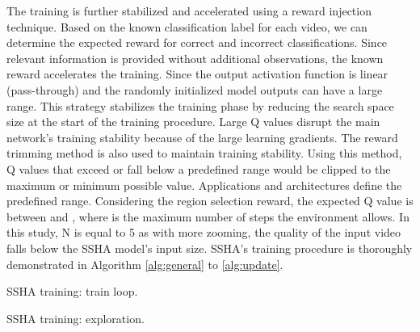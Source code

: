 \documentclass[review]{elsarticle}
\begin{document}
The training is further stabilized and accelerated using a reward injection technique. Based on the known classification label for each video, we can determine the expected reward for correct and incorrect classifications. Since relevant information is provided without additional observations, the known reward accelerates the training. Since the output activation function is linear (pass-through) and the randomly initialized model outputs can have a large range. This strategy stabilizes the training phase by reducing the search space size at the start of the training procedure. Large Q values disrupt the main network's training stability because of the large learning gradients. The reward trimming method is also used to maintain training stability. Using this method, Q values that exceed or fall below a predefined range would be clipped to the maximum or minimum possible value. Applications and architectures define the predefined range. Considering the region selection reward, the expected Q value is between  and , where  is the maximum number of steps the environment allows. In this study, N is equal to 5 as with more zooming, the quality of the input video falls below the SSHA model's input size. SSHA’s training procedure is thoroughly demonstrated in Algorithm \ref{alg:general} to \ref{alg:update}.

\begin{algorithm}
  \caption{SSHA training: train loop.}
  \label{alg:general}
  \begin{algorithmic}[1]
    \FOR{}
        \STATE 
        \STATE 
    \ENDFOR
  \end{algorithmic}
\end{algorithm}

\begin{algorithm}
  \caption{SSHA training:  exploration.}
  \label{alg:action}
  \begin{algorithmic}[1]
    \STATE 
    \STATE 
    \WHILE{}
        \IF{}
            \IF{}
                \STATE 
            \ELSE
                \STATE 
            \ENDIF
            
            \STATE 
        \ELSE
            \STATE  \\ \hskip\algorithmicindent 
        \ENDIF
        
        \STATE 
        \IF{ \\ \hskip\algorithmicindent \AND  \\ \hskip\algorithmicindent \OR  \\ \hskip\algorithmicindent }
            \STATE \hskip\algorithmicindent 
            \STATE \hskip\algorithmicindent 
            \STATE \hskip\algorithmicindent { \\
            \hskip\algorithmicindent \hskip\algorithmicindent }
        \ENDIF
    \ENDWHILE
  
  \end{algorithmic}
\end{algorithm}
\end{document}
